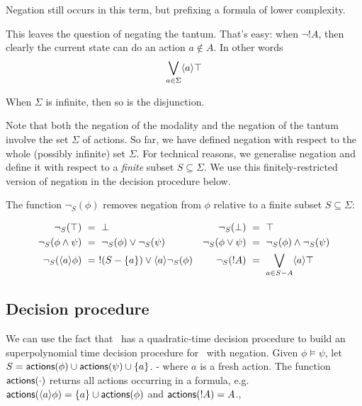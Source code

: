\NI Negation still occurs in this term, but prefixing a formula of
lower complexity.

This leaves the question of negating the tantum. That's easy: when
$\neg !A$, then clearly the current state can do an action $a \notin
A$. In other words
\[
   \bigvee_{a \in \Sigma}\langle a \rangle \top
\]

\NI When $\Sigma$ is infinite, then so is the disjunction.

Note that both the negation of the modality and the negation of
the tantum involve the set $\Sigma$ of actions. 
So far, we have defined negation with respect to
the whole (possibly infinite) set $\Sigma$. For technical reasons, we
generalise negation and define it with respect to a \emph{finite}
subset $S \subseteq \Sigma$. We use this finitely-restricted version of
negation in the decision procedure below.

\begin{definition}
The function $\neg_{S}(\phi)$ removes negation from $\phi$
relative to a finite subset $S \subseteq \Sigma$:

\begin{align*}
  \neg_{S}(\top) &\ =\  \bot  &
  \neg_S(\bot) &\ =\  \top  \\
  \neg_S(\phi \land \psi) &\ =\  \neg_S(\phi) \lor \neg_S(\psi)  &
  \neg_S(\phi \lor \psi) &\ =\  \neg_S(\phi) \land \neg_S(\psi)  \\
  \neg_S(\langle a \rangle \phi) &\ =\  !(S-\{a\}) \lor \langle a \rangle \neg_S(\phi)  &
  \neg_S(! A) &\ =\  \bigvee_{a \in S - A} \langle a \rangle \top
\end{align*}


\end{definition}

\subsection{Decision procedure}

\NI We can use the fact that \cathoristic\ has a quadratic-time
decision procedure to build an superpolynomial time decision procedure for
\cathoristic\ with negation.  Given $\phi \models \psi$, let $S =
\mathsf{actions}(\phi) \cup \mathsf{actions}(\psi) \cup \{a\}$.  - where $a$ is a
fresh action.  The function $\mathsf{actions}(\cdot)$ returns all actions
occurring in a formula, e.g. $\mathsf{actions}(\langle a \rangle \phi) = \{a\} \cup
\mathsf{actions}(\phi)$ and $\mathsf{actions}(!A) = A$.,

